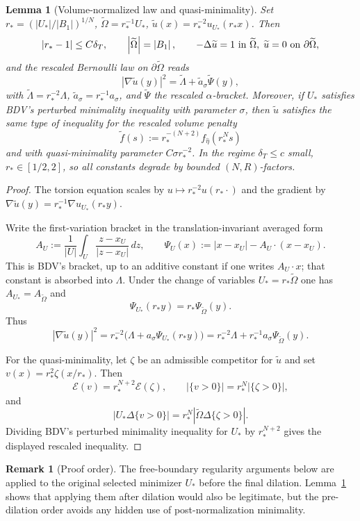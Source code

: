 \documentclass[11pt]{amsart}
\newtheorem{lemma}[theorem]{Lemma}
\theoremstyle{definition}
\newtheorem{remark}[theorem]{Remark}
\newcommand{\abs}[1]{\left|#1\right|}
\renewcommand{\d}{\,d}
\begin{document}
\begin{lemma}[Volume-normalized law and quasi-minimality]\label{lem:rescale}
Set $r_*=(\abs{U_*}/\abs{B_1})^{1/N}$, $\widetilde\Omega=r_*^{-1}U_*$,
$\widetilde u(x)=r_*^{-2}u_{U_*}(r_*x)$. Then
\[
\abs{r_*-1}\le C\delta_T,\qquad
\abs{\widetilde\Omega}=\abs{B_1},\qquad
-\Delta\widetilde u=1\hbox{ in }\widetilde\Omega,\;\widetilde u=0\hbox{ on }\partial\widetilde\Omega,
\]
and the rescaled Bernoulli law on $\partial\widetilde\Omega$ reads
\[
\abs{\nabla\widetilde u(y)}^2=\widetilde\Lambda+\widetilde a_\sigma\widetilde\Psi(y),
\]
with $\widetilde\Lambda=r_*^{-2}\Lambda$, $\widetilde a_\sigma=r_*^{-1}a_\sigma$,
and $\widetilde\Psi$ the rescaled $\alpha$-bracket. Moreover, if $U_*$
satisfies BDV's perturbed minimality inequality with parameter $\sigma$, then
$\widetilde u$ satisfies the same type of inequality for the rescaled volume
penalty
\[
\widetilde f(s):=r_*^{-(N+2)}f_{\hat\eta}(r_*^Ns)
\]
and with quasi-minimality parameter $C\sigma r_*^{-2}$. In the regime
$\delta_T\le c$ small, $r_*\in[1/2,2]$, so all constants degrade by bounded
$(N,R)$-factors.
\end{lemma}

\begin{proof}
The torsion equation scales by $u\mapsto r_*^{-2}u(r_*\cdot)$ and the gradient
by $\nabla\widetilde u(y)=r_*^{-1}\nabla u_{U_*}(r_*y)$.

Write the first-variation bracket in the translation-invariant averaged form
\[
A_U:=\frac1{\abs U}\int_U\frac{z-x_U}{\abs{z-x_U}}\d z,\qquad
\Psi_U(x):=\abs{x-x_U}-A_U\cdot(x-x_U).
\]
This is BDV's bracket, up to an additive constant if one writes $A_U\cdot x$;
that constant is absorbed into $\Lambda$. Under the change of variables
$U_*=r_*\widetilde\Omega$ one has $A_{U_*}=A_{\widetilde\Omega}$ and
\[
\Psi_{U_*}(r_*y)=r_*\Psi_{\widetilde\Omega}(y).
\]
Thus
\[
\abs{\nabla\widetilde u(y)}^2
=r_*^{-2}\bigl(\Lambda+a_\sigma\Psi_{U_*}(r_*y)\bigr)
=r_*^{-2}\Lambda+r_*^{-1}a_\sigma\Psi_{\widetilde\Omega}(y).
\]

For the quasi-minimality, let $\zeta$ be an admissible competitor for
$\widetilde u$ and set $v(x)=r_*^2\zeta(x/r_*)$. Then
\[
\mathcal E(v)=r_*^{N+2}\mathcal E(\zeta),\qquad
\abs{\{v>0\}}=r_*^N\abs{\{\zeta>0\}},
\]
and
\[
\abs{U_*\Delta\{v>0\}}=r_*^N
\abs{\widetilde\Omega\Delta\{\zeta>0\}}.
\]
Dividing BDV's perturbed minimality inequality for $U_*$ by $r_*^{N+2}$
gives the displayed rescaled inequality.
\end{proof}

\begin{remark}[Proof order]
The free-boundary regularity arguments below are applied to the original
selected minimizer $U_*$ before the final dilation. Lemma~\ref{lem:rescale}
shows that applying them after dilation would also be legitimate, but the
pre-dilation order avoids any hidden use of post-normalization minimality.
\end{remark}
\end{document}
